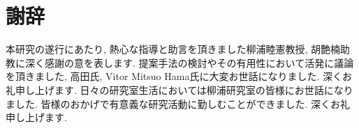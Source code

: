 \chapter*{謝辞}
本研究の遂行にあたり, 熱心な指導と助言を頂きました柳浦睦憲教授, 胡艶楠助教に深く感謝の意を表します.
提案手法の検討やその有用性において活発に議論を頂きました, 高田氏, Vitor Mitsuo Hama氏に大変お世話になりました. 深くお礼申し上げます.
日々の研究室生活においては柳浦研究室の皆様にお世話になりました.
皆様のおかげで有意義な研究活動に勤しむことができました. 深くお礼申し上げます.
